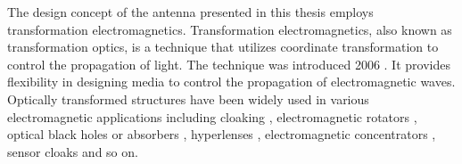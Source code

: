 The design concept of the antenna presented in this thesis employs transformation electromagnetics. Transformation electromagnetics, also known as transformation optics, is a technique that utilizes coordinate transformation to control the propagation of light. The technique was introduced 2006 \cite{Pendry2006}\cite{Leonhardt2009}. It provides flexibility in designing media to control the propagation of electromagnetic waves. Optically transformed structures have been widely used in various electromagnetic applications including cloaking \cite{Schmied2010}\cite{Rahm2008}, electromagnetic rotators \cite{Luo2008}\cite{Chen2009}, optical black holes or absorbers \cite{Cheng2010} \cite{Narimanov2009}, hyperlenses \cite{Kildishev2007}\cite{ Tsang2008}, electromagnetic concentrators \cite{Yaghjian2008}\cite{Jiang2008}, sensor cloaks \cite{Alu2009} and so on. %

%
%
%

